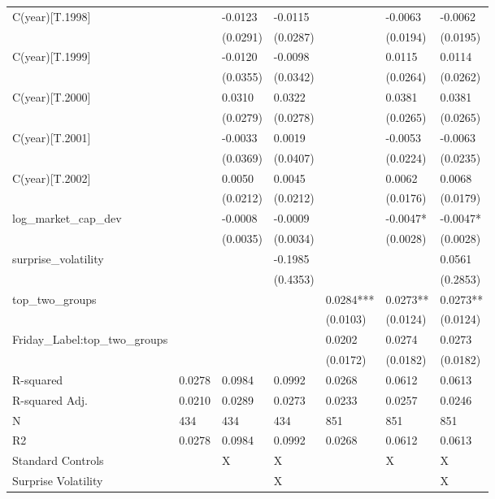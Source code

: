 \begin{tabular}{lllllll}
C(year)[T.1998] &  & -0.0123 & -0.0115 &  & -0.0063 & -0.0062 \\
 &  & (0.0291) & (0.0287) &  & (0.0194) & (0.0195) \\
C(year)[T.1999] &  & -0.0120 & -0.0098 &  & 0.0115 & 0.0114 \\
 &  & (0.0355) & (0.0342) &  & (0.0264) & (0.0262) \\
C(year)[T.2000] &  & 0.0310 & 0.0322 &  & 0.0381 & 0.0381 \\
 &  & (0.0279) & (0.0278) &  & (0.0265) & (0.0265) \\
C(year)[T.2001] &  & -0.0033 & 0.0019 &  & -0.0053 & -0.0063 \\
 &  & (0.0369) & (0.0407) &  & (0.0224) & (0.0235) \\
C(year)[T.2002] &  & 0.0050 & 0.0045 &  & 0.0062 & 0.0068 \\
 &  & (0.0212) & (0.0212) &  & (0.0176) & (0.0179) \\
log_market_cap_dev &  & -0.0008 & -0.0009 &  & -0.0047* & -0.0047* \\
 &  & (0.0035) & (0.0034) &  & (0.0028) & (0.0028) \\
surprise_volatility &  &  & -0.1985 &  &  & 0.0561 \\
 &  &  & (0.4353) &  &  & (0.2853) \\
top_two_groups &  &  &  & 0.0284*** & 0.0273** & 0.0273** \\
 &  &  &  & (0.0103) & (0.0124) & (0.0124) \\
Friday_Label:top_two_groups &  &  &  & 0.0202 & 0.0274 & 0.0273 \\
 &  &  &  & (0.0172) & (0.0182) & (0.0182) \\
R-squared & 0.0278 & 0.0984 & 0.0992 & 0.0268 & 0.0612 & 0.0613 \\
R-squared Adj. & 0.0210 & 0.0289 & 0.0273 & 0.0233 & 0.0257 & 0.0246 \\
N & 434 & 434 & 434 & 851 & 851 & 851 \\
R2 & 0.0278 & 0.0984 & 0.0992 & 0.0268 & 0.0612 & 0.0613 \\
Standard Controls &  & X & X &  & X & X \\
Surprise Volatility &  &  & X &  &  & X \\
\bottomrule
\end{tabular}
